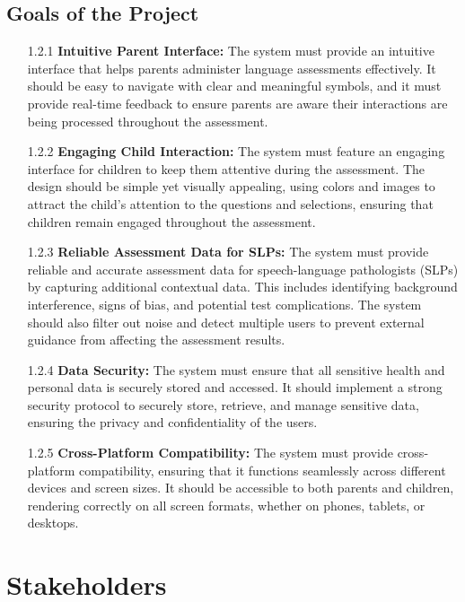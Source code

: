 \documentclass[12pt]{article}
\begin{document}
\subsection{Goals of the Project}
\begin{itemize}
  \item[1.2.1] \textbf{Intuitive Parent Interface:}  
  The system must provide an intuitive interface that helps parents administer 
  language assessments effectively. It should be easy to navigate with clear and 
  meaningful symbols, and it must provide real-time feedback to ensure parents are 
  aware their interactions are being processed throughout the assessment.

  \item[1.2.2] \textbf{Engaging Child Interaction:}  
  The system must feature an engaging interface for children to keep them attentive 
  during the assessment. The design should be simple yet visually appealing, using 
  colors and images to attract the child’s attention to the questions and selections,
  ensuring that children remain engaged throughout the assessment.

  \item[1.2.3] \textbf{Reliable Assessment Data for SLPs:}  
  The system must provide reliable and accurate assessment data for speech-language 
  pathologists (SLPs) by capturing additional contextual data. This includes 
  identifying background interference, signs of bias, and potential test 
  complications. The system should also filter out noise and detect multiple users 
  to prevent external guidance from affecting the assessment results.

  \item[1.2.4] \textbf{Data Security:}  
  The system must ensure that all sensitive health and personal data is securely 
  stored and accessed. It should implement a strong security protocol to securely 
  store, retrieve, and manage sensitive data, ensuring the privacy and confidentiality
  of the users.

  \item[1.2.5] \textbf{Cross-Platform Compatibility:}  
  The system must provide cross-platform compatibility, ensuring that it functions 
  seamlessly across different devices and screen sizes. It should be accessible to 
  both parents and children, rendering correctly on all screen formats, whether on 
  phones, tablets, or desktops.
\end{itemize}

\section{Stakeholders}
\end{document}
